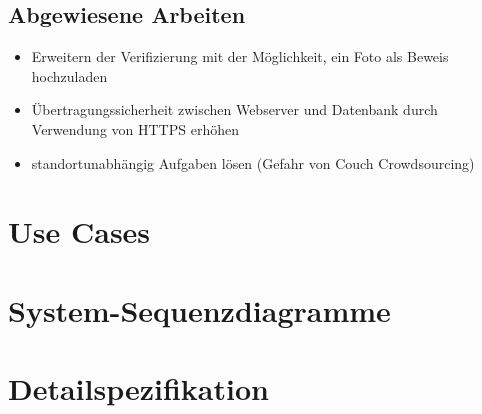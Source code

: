 \subsection{Abgewiesene Arbeiten}
\begin{itemize}
	\item Erweitern der Verifizierung mit der Möglichkeit, ein Foto als Beweis hochzuladen
	\item Übertragungssicherheit zwischen Webserver und Datenbank durch Verwendung von HTTPS erhöhen
	\item standortunabhängig Aufgaben lösen (Gefahr von Couch Crowdsourcing)
\end{itemize}


\section{Use Cases}


\section{System-Sequenzdiagramme}


\section{Detailspezifikation}

